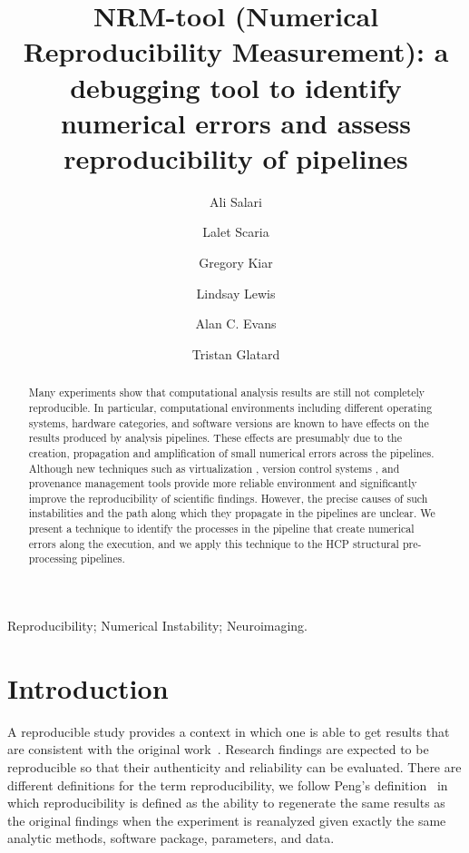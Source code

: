 \documentclass[a4paper,num-refs]{oup-contemporary}
\title{NRM-tool (Numerical Reproducibility Measurement): 
a debugging tool to identify numerical errors 
and assess reproducibility of pipelines}
\begin{document}
\author[1]{Ali Salari}
\author[1]{Lalet Scaria}
\author[2,3]{Gregory Kiar}
\author[2]{Lindsay Lewis}
\author[2,3]{Alan C. Evans}
\author[1]{Tristan Glatard}


\maketitle

\begin{abstract}
Many experiments show that computational analysis results are still not 
completely reproducible. In particular, computational environments 
including different operating systems, hardware categories, and 
software versions are known to have effects on the results produced by 
analysis pipelines. These effects are presumably due to the creation, 
propagation and amplification of small numerical errors across the 
pipelines. 
Although new techniques such as virtualization , version 
control systems , and provenance management tools provide more reliable 
environment and significantly improve the reproducibility of scientific 
findings. 
However, the precise causes of such instabilities and the path along 
which they propagate in the pipelines are unclear.  We present a 
technique to identify the processes in the pipeline that create 
numerical errors along the execution, and we apply this technique to 
the HCP structural pre-processing pipelines.

\end{abstract}

\begin{keywords}
Reproducibility; Numerical Instability; Neuroimaging.
\end{keywords}

\section{Introduction}

A reproducible study provides a context in which one is able to get 
results that are consistent with the original 
work~\cite{plesser2018reproducibility}. Research findings are expected 
to be reproducible so that their authenticity and reliability can be 
evaluated. 
There are different definitions for the term reproducibility, we follow 
Peng's definition~\cite{peng2011reproducible} in which reproducibility 
is defined as the ability to regenerate the same results as the 
original findings when the experiment is reanalyzed given exactly the 
same analytic methods, software package, parameters, and data. 
\end{document}
